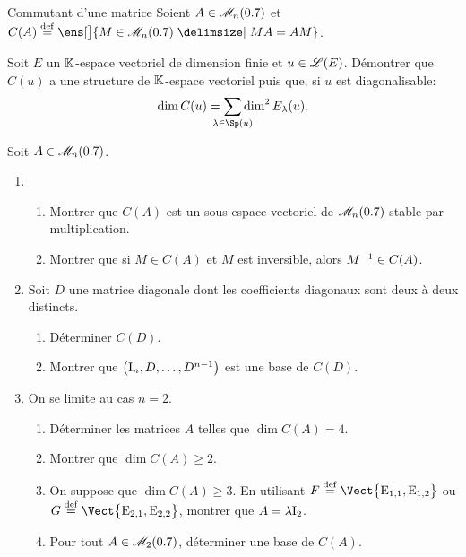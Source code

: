 \begin{defi}{Commutant d'une matrice}
    Soient $A \in \mathscr{M}_n(0.7)$ et $C(A) \defeq \ens[\big]{M \in \M_n(\R) \tq MA = AM }$.
\end{defi}

\begin{exercice}
    Soit $E$ un $\mathbb{K}$-espace vectoriel de dimension finie et $u \in \mathscr{L}(E)$. Démontrer que $C(u)$ a une structure de $\mathbb{K}$-espace vectoriel puis que, si $u$ est diagonalisable:
    $$\dim C(u) = \smashoperator{\sum_{\lambda \in \Sp(u)}} \dim^2 E_\lambda(u).$$
\end{exercice}

\begin{solution}
    
\end{solution}

\begin{exercice}
    Soit $A \in \mathscr{M}_n(0.7)$.
    \begin{enumerate}
        \item 
        \begin{enumerate}
            \item Montrer que $C(A)$ est un sous-espace vectoriel de $\mathscr{M}_n(0.7)$ stable par multiplication.
            \item Montrer que si $M \in C(A)$ et $M$ est inversible, alors $M^{-1} \in C(A)$.
        \end{enumerate}
        \item Soit $D$ une matrice diagonale dont les coefficients diagonaux sont deux à deux distincts.
        \begin{enumerate}
            \item Déterminer $C(D)$.
            \item Montrer que $\big(\mathrm{I}_n, D, \dots, D^{n-1}\big)$ est une base de $C(D)$.
        \end{enumerate}
        \item On se limite au cas $n=2$.
        \begin{enumerate}
            \item Déterminer les matrices $A$ telles que $\dim C(A) = 4$.
            \item Montrer que $\dim C(A) \geqslant 2$. 
            \item On suppose que $\dim C(A) \geqslant 3$. En utilisant $F \defeq \Vect \big\{ \mathrm{E}_{1, 1}, \mathrm{E}_{1, 2} \big\}$ ou $G \defeq \Vect \big\{ \mathrm{E}_{2, 1}, \mathrm{E}_{2, 2} \big\}$, montrer que $A = \lambda \mathrm{I}_2$.
            \item Pour tout $A \in \mathscr{M}_2(0.7)$, déterminer une base de $C(A)$.
        \end{enumerate}
    \end{enumerate}
\end{exercice}

